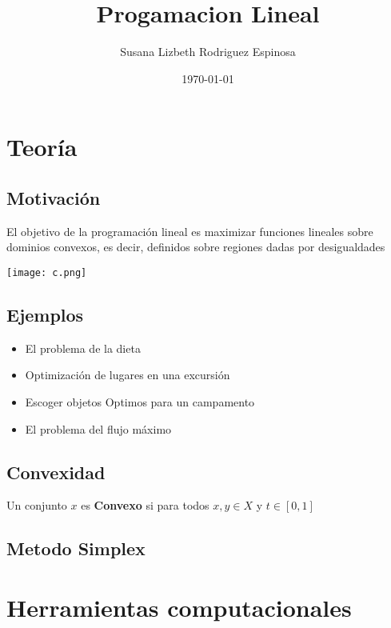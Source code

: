 \documentclass[11pt]{article}
\author{Susana Lizbeth Rodriguez Espinosa}
\date{\today}
\title{Progamacion Lineal}
\begin{document}
\maketitle
\tableofcontents


\section{Teoría}
\label{sec:orgd32afd2}
\subsection{Motivación}
\label{sec:orgbe39da9}
El objetivo de la programación lineal es maximizar funciones lineales
sobre dominios convexos, es decir, definidos sobre regiones dadas por
desigualdades

\begin{center}
\texttt{[image: c.png]}
\end{center}
\subsection{Ejemplos}
\label{sec:org898f252}

\begin{itemize}
\item El problema de la dieta
\item Optimización de lugares en una excursión
\item Escoger objetos Optimos para un campamento
\item El problema del flujo máximo
\end{itemize}

\subsection{Convexidad}
\label{sec:orgec9a3a6}
Un conjunto \(x\) es \textbf{Convexo} si para todos \(x,y\in X\) y \(t\in[0,1]\)

\subsection{Metodo Simplex}
\label{sec:org1c3f084}
\section{Herramientas computacionales}
\label{sec:orge615a45}
\end{document}
